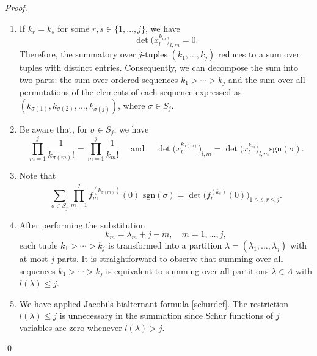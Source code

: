 \documentclass[smallextended]{svjour3}       %
\begin{document}
\begin{proof}
\begin{enumerate}
    \item[(2)] If \(k_r = k_s\) for some \(r, s \in \{1, \dots, j\} \), we have  
    \[\det\Big(x_l^{k_m}\Big)_{l,m}=0.\]
 Therefore, the summatory over \(j\)-tuples \((k_1, \dots, k_j)\) reduces to a sum over tuples with distinct entries. Consequently, we can decompose the sum into two parts: the sum over ordered sequences \(k_1 > \cdots > k_j\) and the sum over all permutations of the elements of each sequence expressed as \((k_{\sigma(1)}, k_{\sigma(2)}, \dots, k_{\sigma(j)})\), where \(\sigma \in S_j\).
 
    
    
    \item[(3)] Be aware that, for $\sigma\in S_j$, we have 
    \begin{equation*}
      \prod_{m=1}^j \frac{1}{k_{\sigma(m)}!}= \prod_{m=1}^j \frac{1}{k_m!}\quad \text{ and }\quad \det\Big(x_l^{k_{\sigma(m)}}\Big)_{l,m}=\det\Big(x_l^{k_{m}}\Big)_{l,m}\text{sgn}(\sigma).
    \end{equation*}
    \item[(4)] Note that
    \begin{equation*}
        \sum_{\sigma\in S_j} \prod_{m=1}^j f_m^{(k_{\sigma(m)})}(0)\text{ sgn}(\sigma)=\det\Big(f_r^{(k_s)}(0)\Big)_{1\leq s,r\leq j}.
    \end{equation*}
    \item[(5)] 
After performing the substitution  
\begin{equation*}
    k_m = \lambda_m + j - m, \quad m = 1, \dots, j,
\end{equation*}  
each tuple \(k_1 > \cdots > k_j\) is transformed into a partition \(\lambda=(\lambda_1, \dots, \lambda_j)\) with at most \(j\) parts. It is straightforward to observe that summing over all sequences \(k_1 > \cdots > k_j\) is equivalent to summing over all partitions \(\lambda\in\Lambda\) with \(l(\lambda) \leq j\).  

\item[(6)] We have applied Jacobi's bialternant formula \eqref{schurdef}.  The restriction \(l(\lambda) \leq j\) is unnecessary in the summation since Schur functions of $j$ variables are zero whenever \(l(\lambda) > j\).  
\end{enumerate}
 \qed
\end{proof}
\end{document}
